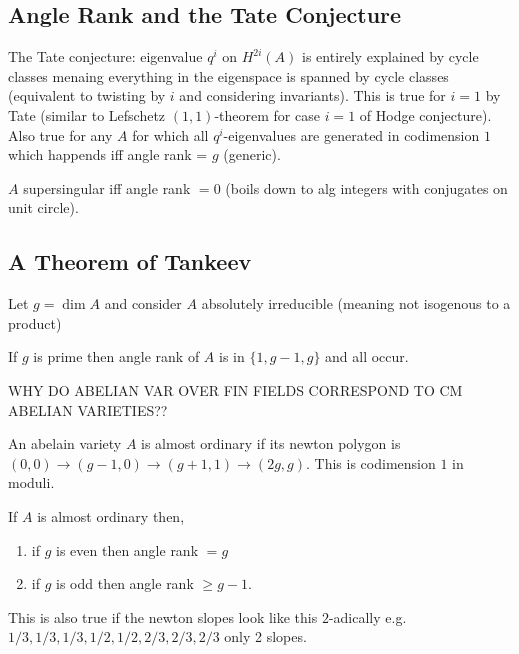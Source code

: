 \documentclass[12pt]{article}
\begin{document}
\subsection{Angle Rank and the Tate Conjecture}

The Tate conjecture: eigenvalue $q^i$ on $H^{2i}(A)$ is entirely explained by cycle classes menaing everything in the eigenspace is spanned by cycle classes (equivalent to twisting by $i$ and considering invariants). This is true for $i = 1$ by Tate (similar to Lefschetz $(1,1)$-theorem for case $i = 1$ of Hodge conjecture). Also true for any $A$ for which all $q^i$-eigenvalues are generated in codimension $1$ which happends iff angle rank = $g$ (generic).

\begin{example}
$A$ supersingular iff angle rank $ = 0$ (boils down to alg integers with conjugates on unit circle).
\end{example}

\subsection{A Theorem of Tankeev}

Let $g = \dim{A}$ and consider $A$ absolutely irreducible (meaning not isogenous to a product)

\begin{thm}[Tankeev, 1984]
If $g$ is prime then angle rank of $A$ is in $\{1, g-1, g \}$ and all occur. 
\end{thm}

WHY DO ABELIAN VAR OVER FIN FIELDS CORRESPOND TO CM ABELIAN VARIETIES??

\begin{defn}
An abelain variety $A$ is almost ordinary if its newton polygon is $(0,0) \to (g-1,0) \to (g+1, 1) \to (2g,g)$. This is codimension $1$ in moduli. 
\end{defn}

\begin{thm}
If $A$ is almost ordinary then,
\begin{enumerate}
\item if $g$ is even then angle rank $= g$
\item if $g$ is odd then angle rank $\ge g - 1$. 
\end{enumerate}
\end{thm}

\begin{rmk}
This is also true if the newton slopes look like this $2$-adically e.g. $1/3, 1/3, 1/3, 1/2,1/2, 2/3, 2/3,2/3$ only 2 slopes.
\end{rmk}
\end{document}
